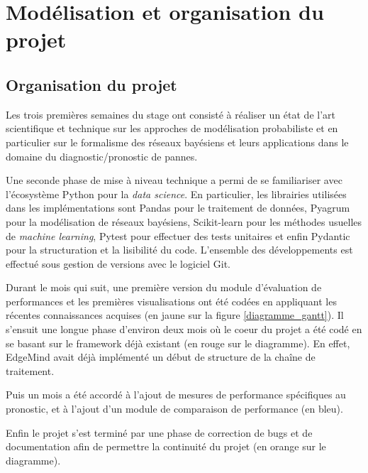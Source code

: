 \chapter{Modélisation et organisation du projet}
\clearpage
\section{Organisation du projet}

Les trois premières semaines du stage ont consisté à réaliser un état de l’art scientifique et technique sur les approches de modélisation probabiliste \cite{pradhan_knowledge_1994} \cite{dechter_bucket_1998} \cite{nielsen_bayesian_2009} et en particulier sur le formalisme des réseaux bayésiens et leurs applications  dans le domaine du diagnostic/pronostic de pannes. \cite{giurgiu_explainable_2019}\cite{noauthor_transparency_2019} \cite{chen_railway_2019}\cite{shi_fault_2006}\cite{zhang_fault_2017}\cite{cai_bayesian_2017}\cite{krishnamurthi_expert_1992}\cite{huang_probability_2008}\cite{chen-fu_chien_using_2002}\cite{han_universal_2008}

Une seconde phase de mise à niveau technique a permi de se familiariser avec  l’écosystème Python pour la \textit{data science}. En particulier, les librairies utilisées dans les implémentations sont Pandas pour le traitement de données, Pyagrum pour la modélisation de réseaux bayésiens, Scikit-learn pour les  méthodes usuelles de \textit{machine learning}, Pytest pour effectuer des tests unitaires et enfin Pydantic pour la structuration et la lisibilité du code. L’ensemble des développements est effectué sous gestion de versions avec le logiciel Git.

Durant le mois qui suit, une première version du module d’évaluation de performances et les premières visualisations ont été codées en appliquant les récentes connaissances acquises (en jaune sur la figure \ref{diagramme_gantt}).
Il s’ensuit une longue phase d’environ deux mois où le coeur du projet a été codé en se basant sur le framework déjà existant (en rouge sur le diagramme). En effet, EdgeMind avait déjà implémenté un début de structure de la chaîne de traitement.

Puis un mois a été accordé à l’ajout de mesures de performance spécifiques au pronostic, et à l’ajout d’un module de comparaison de performance (en bleu).

Enfin le projet s’est terminé par une phase de correction de bugs et de documentation afin de permettre la continuité du projet (en orange sur le diagramme).

